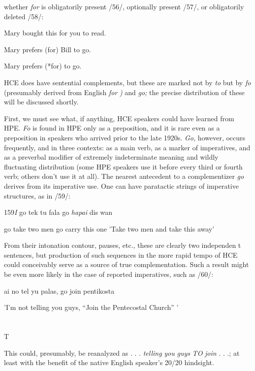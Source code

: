 whether \textit{for} is obligatorily present /56/, optionally present /57/, or obligatorily deleted /58/:

\ea\label{ex:56}
 Mary bought this for you to read.
\glt
\z

\ea\label{ex:57}
 Mary prefers (for) Bill to go.
\glt
\z

\ea\label{ex:58}
 Mary prefers (*for) to go.
\glt
\z

HCE does have sentential complements, but these are marked not by \textit{to} but by \textit{fo} (presumably derived from English \textit{for} \textit{)} and \textit{go;} the precise distribution of these will be discussed shortly.

First, we must see what, if anything, HCE speakers could have learned from HPE. \textit{Fo} is found in HPE only as a preposition, and it is rare even as a preposition in speakers who arrived prior to the late 1920s. \textit{Go,} however, occurs frequently, and in three contexts: as a main verb, as a marker of imperatives, and as a preverbal modifier of extremely indeterminate meaning and wildly fluctuating distribution (some HPE speakers use it before every third or fourth verb; others don't use it at all). The nearest antecedent to a complementizer \textit{go} derives from its imperative use. One can have paratactic strings of imperative structures, as in /59/:

159\textit{I} go tek tu fala go \textit{hapai} dis wan

go take two men go carry this one 'Take two men and take this away'

From their intonation contour, pauses, etc., these are clearly two independen t sentences, but production of such sequences in the more rapid tempo of HCE could conceivably serve as a source of true comple\-mentation. Such a result might be even more likely in the case of reported imperatives, such as /60/:

\ea\label{ex:60}
 ai no tel yu palas, go join pentikosta
\glt
\z

'I'm not telling you guys, ``Join the Pentecostal Church'' '

\section{}
T


This could, presumably, be reanalyzed as . . . \textit{telling} \textit{you} \textit{guys} \textit{TO} \textit{join} . . .; at least with the benefit of the native English speaker's 20/20 hindsight.

